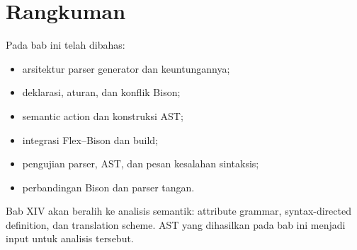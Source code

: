 \section*{Rangkuman}

Pada bab ini telah dibahas:
\begin{itemize}[leftmargin=*]
  \item arsitektur parser generator dan keuntungannya;
  \item deklarasi, aturan, dan konflik Bison;
  \item semantic action dan konstruksi AST;
  \item integrasi Flex--Bison dan build;
  \item pengujian parser, AST, dan pesan kesalahan sintaksis;
  \item perbandingan Bison dan parser tangan.
\end{itemize}

Bab XIV akan beralih ke analisis semantik: attribute grammar,
syntax-directed definition, dan translation scheme. AST yang
dihasilkan pada bab ini menjadi input untuk analisis tersebut.
